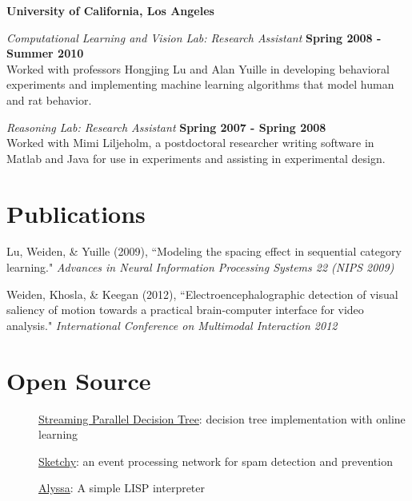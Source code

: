 \documentclass[margin,line]{res}
\newenvironment{list1}{
  \begin{list}{\ding{113}}{%
      \setlength{\itemsep}{0in}
      \setlength{\parsep}{0in} \setlength{\parskip}{0in}
      \setlength{\topsep}{0in} \setlength{\partopsep}{0in}
      \setlength{\leftmargin}{0.17in}}}{\end{list}}
\begin{document}
\begin{resume}
{\bf University of California, Los Angeles}\\
\vspace*{-.1in}
\begin{list1}
\item[] {\em Computational Learning and Vision Lab: Research Assistant} \hfill {\bf Spring 2008 - Summer 2010}\\
Worked with professors Hongjing Lu and Alan Yuille in developing behavioral experiments and implementing machine learning algorithms that model human and rat behavior.\\
\vspace*{-.1in}
\item[] {\em Reasoning Lab: Research Assistant} \hfill {\bf Spring 2007 - Spring 2008}\\
Worked with Mimi Liljeholm, a postdoctoral researcher writing software in Matlab and Java for use in experiments and assisting in experimental design.
\end{list1}

\section{\sc Publications}
\begin{list1}
\item[] Lu, Weiden, \& Yuille (2009), ``Modeling the spacing effect in sequential category learning." {\em Advances in Neural Information Processing Systems 22 (NIPS 2009)}
\item[] Weiden, Khosla, \& Keegan (2012), ``Electroencephalographic detection of visual saliency of motion towards a practical brain-computer interface for video analysis." {\em International Conference on Multimodal Interaction 2012}
\end{list1}
\nocite{*}
\printbibliography

\section{\sc Open Source}
\begin{description}
\item[] \href{https://github.com/soundcloud/spdt}{Streaming Parallel Decision Tree}: decision tree implementation with online learning
\item[] \href{https://github.com/soundcloud/sketchy-core}{Sketchy}: an event processing network for spam detection and prevention
\item[] \href{https://github.com/mweiden/alyssa}{Alyssa}: A simple LISP interpreter
\end{description}


\end{resume}
\end{document}

